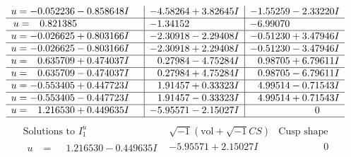 \documentclass[1p]{elsarticle_modified}
\theoremstyle{definition}
\newcommand{\I}{\sqrt{-1}}
\begin{document}
$$\begin{array}{c|c|c}
\begin{aligned}
u &= -0.052236 - 0.858648 I\end{aligned}
 & -4.58264 + 3.82645 I & -1.55259 - 2.33220 I \\ \hline\begin{aligned}
u &= \phantom{-}0.821385\phantom{ +0.000000I}\end{aligned}
 & -1.34152\phantom{ +0.000000I} & -6.99070\phantom{ +0.000000I} \\ \hline\begin{aligned}
u &= -0.026625 + 0.803166 I\end{aligned}
 & -2.30918 - 2.29408 I & -0.51230 + 3.47946 I \\ \hline\begin{aligned}
u &= -0.026625 - 0.803166 I\end{aligned}
 & -2.30918 + 2.29408 I & -0.51230 - 3.47946 I \\ \hline\begin{aligned}
u &= \phantom{-}0.635709 + 0.474037 I\end{aligned}
 & \phantom{-}0.27984 - 4.75284 I & \phantom{-}0.98705 + 6.79611 I \\ \hline\begin{aligned}
u &= \phantom{-}0.635709 - 0.474037 I\end{aligned}
 & \phantom{-}0.27984 + 4.75284 I & \phantom{-}0.98705 - 6.79611 I \\ \hline\begin{aligned}
u &= -0.553405 + 0.447723 I\end{aligned}
 & \phantom{-}1.91457 + 0.33323 I & \phantom{-}4.99514 - 0.71543 I \\ \hline\begin{aligned}
u &= -0.553405 - 0.447723 I\end{aligned}
 & \phantom{-}1.91457 - 0.33323 I & \phantom{-}4.99514 + 0.71543 I \\ \hline\begin{aligned}
u &= \phantom{-}1.216530 + 0.449635 I\end{aligned}
 & -5.95571 - 2.15027 I & \phantom{-0.000000 } 0\\
 \hline 
 \end{array}$$\newpage$$\begin{array}{c|c|c}  
\text{Solutions to }I^u_{1}& \I (\text{vol} + \sqrt{-1}CS) & \text{Cusp shape}\\
 \hline 
\begin{aligned}
u &= \phantom{-}1.216530 - 0.449635 I\end{aligned}
 & -5.95571 + 2.15027 I & \phantom{-0.000000 } 0 \\ \hline\begin{aligned}

\end{aligned}
\end{array}$$
\end{document}
